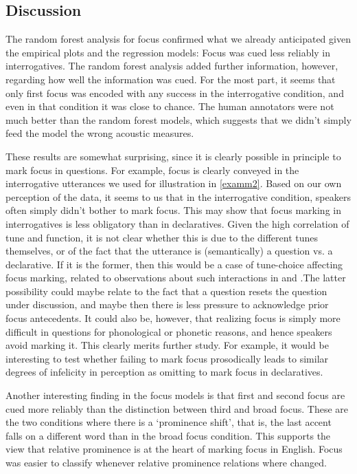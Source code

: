 \documentclass[preprint,review,12pt,authoryear,times]{elsarticle}
\begin{document}
\subsection{Discussion}
\label{twoprom}

The random forest analysis for focus confirmed what we already anticipated given the empirical plots and the regression models: Focus was cued less reliably in interrogatives. The random forest analysis added further information, however, regarding how well the information was cued. For the most part, it seems that only first focus was encoded with any success in the interrogative condition, and even in that condition it was close to chance. The human annotators were not much better than the random forest models, which suggests that we didn't simply feed the model the wrong acoustic measures. 

These results are somewhat surprising, since it is clearly possible in principle to mark focus in questions. For example, focus is clearly conveyed in the interrogative utterances we used for illustration in \ref{examm2}. Based on our own perception of the data, it seems to us that in the interrogative condition, speakers often simply didn't bother to mark focus. This may show that focus marking in interrogatives is less obligatory than in declaratives. Given the high correlation of tune and function, it is not clear whether this is due to the different tunes themselves, or of the fact that the utterance is (semantically) a question vs. a declarative. If it is the former, then this would be a case of tune-choice affecting focus marking, related to observations about such interactions in  \citet{goodhueetal16} and \citet{schlo18}.The latter possibility could maybe relate to the fact that a question resets the question under discussion, and maybe then there is less pressure to acknowledge prior focus antecedents. It could also be, however, that realizing focus is simply more difficult in questions for phonological or phonetic reasons, and hence speakers avoid marking it. This clearly merits further study. For example, it would be interesting to test whether failing to mark focus prosodically leads to similar degrees of infelicity in perception as omitting to mark focus in declaratives. 

Another interesting finding in the focus models is that first and second focus are cued more reliably than the distinction between third and broad focus. These are the two conditions where there is a `prominence shift', that is, the last accent falls on a different word than in the broad focus condition. This supports the view that relative prominence is at the heart of marking focus in English. Focus was easier to classify whenever relative prominence relations where changed. 
\end{document}
